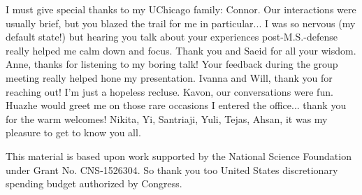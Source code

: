 I must give special thanks to my UChicago family: Connor. Our interactions were
usually brief, but you blazed the trail for me in particular... I was so nervous
(my default state!) but hearing you talk about your experiences
post-M.S.-defense really helped me calm down and focus. Thank you and Saeid for
all your wisdom. Anne, thanks for listening to my boring talk! Your feedback
during the group meeting really helped hone my presentation. Ivanna and Will,
thank you for reaching out! I'm just a hopeless recluse. Kavon, our
conversations were fun. Huazhe would greet me on those rare occasions I entered
the office... thank you for the warm welcomes! Nikita, Yi, Santriaji, Yuli,
Tejas, Ahsan, it was my pleasure to get to know you all.

This material is based upon work supported by the National Science Foundation
under Grant No. CNS-1526304. So thank you too United States discretionary
spending budget authorized by Congress.
